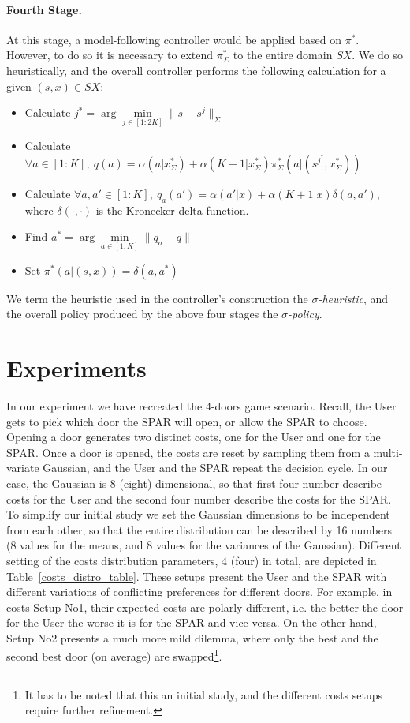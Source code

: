 \documentclass{msdm2012}
\begin{document}
\paragraph{Fourth Stage.} 
At this stage, a model-following controller would be applied based on
$\pi^*$. However, to do so it is necessary to extend $\pi^*_\Sigma$ to
the entire domain $SX$. We do so heuristically, and the overall
controller performs the following calculation for a given $(s,x)\in
SX$:
\begin{itemize}
\item Calculate $j^*=\arg\min\limits_{j\in[1:2K]}\|s-s^j\|_\Sigma$
\item Calculate $\forall a\in[1:K],\ q(a)=\alpha(a|x^*_\Sigma)+\alpha(K+1|x^*_\Sigma)\pi^*_\Sigma(a|(s^{j^*},x^*_\Sigma))$
\item Calculate $\forall
  a,a'\in[1:K],\ q_a(a')=\alpha(a'|x)+\alpha(K+1|x)\delta(a,a')$,
  where $\delta(\cdot,\cdot)$ is the Kronecker delta function.
\item Find $a^*=\arg\min\limits_{a\in[1:K]}\|q_a-q\|$
\item Set $\pi^*(a|(s,x))=\delta(a,a^*)$
\end{itemize}

We term the heuristic used in the controller's construction the {\em
  $\sigma$-heuristic}, and the overall policy produced by the above
four stages the {\em $\sigma$-policy}.

\section{Experiments}\label{exps}
In our experiment we have recreated the 4-doors game scenario. Recall,
the User gets to pick which door the SPAR will open, or allow the SPAR
to choose. Opening a door generates two distinct costs, one for the
User and one for the SPAR. Once a door is opened, the costs are reset
by sampling them from a multi-variate Gaussian, and the User and the
SPAR repeat the decision cycle. In our case, the Gaussian is 8 (eight)
dimensional, so that first four number describe costs for the User and
the second four number describe the costs for the SPAR. To simplify
our initial study we set the Gaussian dimensions to be independent
from each other, so that the entire distribution can be described by
16 numbers (8 values for the means, and 8 values for the variances of
the Gaussian). Different setting of the costs distribution parameters,
4 (four) in total, are depicted in
Table~\ref{costs_distro_table}. These setups present the User and the
SPAR with different variations of conflicting preferences for
different doors. For example, in costs Setup No1, their expected costs
are polarly different, i.e. the better the door for the User the worse
it is for the SPAR and vice versa. On the other hand, Setup No2
presents a much more mild dilemma, where only the best and the second
best door (on average) are swapped\footnote{It has to be noted that this an initial study, and the different costs setups require further refinement.}.
\end{document}
